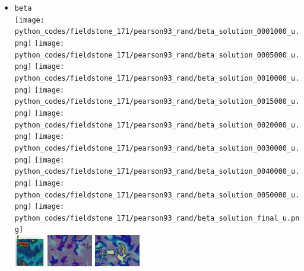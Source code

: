 \begin{itemize}
\item {\tt beta}\\
\texttt{[image: python\_codes/fieldstone\_171/pearson93\_rand/beta\_solution\_0001000\_u.png]}
\texttt{[image: python\_codes/fieldstone\_171/pearson93\_rand/beta\_solution\_0005000\_u.png]}
\texttt{[image: python\_codes/fieldstone\_171/pearson93\_rand/beta\_solution\_0010000\_u.png]}
\texttt{[image: python\_codes/fieldstone\_171/pearson93\_rand/beta\_solution\_0015000\_u.png]}
\texttt{[image: python\_codes/fieldstone\_171/pearson93\_rand/beta\_solution\_0020000\_u.png]}
\texttt{[image: python\_codes/fieldstone\_171/pearson93\_rand/beta\_solution\_0030000\_u.png]}
\texttt{[image: python\_codes/fieldstone\_171/pearson93\_rand/beta\_solution\_0040000\_u.png]}
\texttt{[image: python\_codes/fieldstone\_171/pearson93\_rand/beta\_solution\_0050000\_u.png]}
\texttt{[image: python\_codes/fieldstone\_171/pearson93\_rand/beta\_solution\_final\_u.png]}\\
\includegraphics[height=1.4cm]{python_codes/fieldstone_171/images/pear93_beta}
\includegraphics[height=1.4cm]{python_codes/fieldstone_171/images/munafo_beta1}
\includegraphics[height=1.4cm]{python_codes/fieldstone_171/images/munafo_beta2}


\end{itemize}
